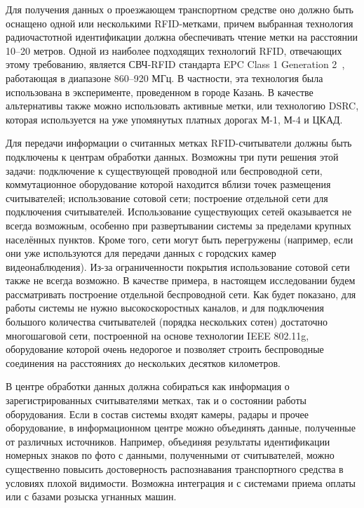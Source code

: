Для получения данных о проезжающем транспортном средстве оно должно быть оснащено одной или несколькими RFID-метками, причем выбранная технология радиочастотной идентификации должна обеспечивать чтение метки на расстоянии 10--20 метров. Одной из наиболее подходящих технологий RFID, отвечающих этому требованию, является СВЧ-RFID стандарта EPC Class 1 Generation 2~\cite{StdGen2}, работающая в диапазоне 860--920 МГц. В частности, эта технология была использована в эксперименте, проведенном в городе Казань. В качестве альтернативы также можно использовать активные метки, или технологию DSRC, которая используется на уже упомянутых платных дорогах М-1, М-4 и ЦКАД.


Для передачи информации о считанных метках RFID-считыватели должны быть подключены к центрам обработки данных. Возможны три пути решения этой задачи: подключение к существующей проводной или беспроводной сети, коммутационное оборудование которой находится вблизи точек размещения считывателей; использование сотовой сети; построение отдельной сети для подключения считывателей. Использование существующих сетей оказывается не всегда возможным, особенно при развертывании системы за пределами крупных населённых пунктов. Кроме того, сети могут быть перегружены (например, если они уже используются для передачи данных с городских камер видеонаблюдения). Из-за ограниченности покрытия использование сотовой сети также не всегда возможно. В качестве примера, в настоящем исследовании будем рассматривать построение отдельной беспроводной сети. Как будет показано, для работы системы не нужно высокоскоростных каналов, и для подключения большого количества считывателей (порядка нескольких сотен) достаточно многошаговой сети, построенной на основе технологии IEEE 802.11g, оборудование которой очень недорогое и позволяет строить беспроводные соединения на расстояниях до нескольких десятков километров.

В центре обработки данных должна собираться как информация о зарегистрированных считывателями метках, так и о состоянии работы оборудования. Если в состав системы входят камеры, радары и прочее оборудование, в информационном центре можно объединять данные, полученные от различных источников. Например, объединяя результаты идентификации номерных знаков по фото с данными, полученными от считывателей, можно существенно повысить достоверность распознавания транспортного средства в условиях плохой видимости. Возможна интеграция и с системами приема оплаты или с базами розыска угнанных машин.

